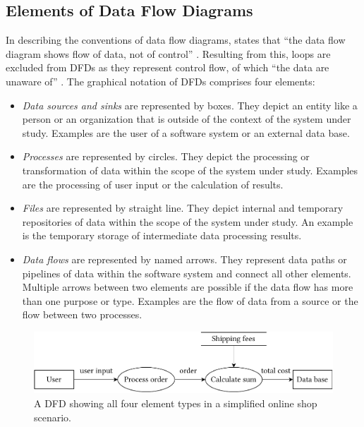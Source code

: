\subsection{Elements of Data Flow Diagrams}

In describing the conventions of data flow diagrams, \textcite{demarco_structure_1979} states that \enquote{the data flow diagram shows flow of data, not of control} \cite{demarco_structure_1979}.
Resulting from this, loops are excluded from \acp{DFD} as they represent control flow, of which \enquote{the data are unaware of} \cite{demarco_structure_1979}.
The graphical notation of \acp{DFD} comprises four elements:

\begin{itemize}
    \item \emph{Data sources and sinks} are represented by boxes.
    They depict an entity like a person or an organization that is outside of the context of the system under study.
    Examples are the user of a software system or an external data base.
    \item \emph{Processes} are represented by circles.
    They depict the processing or transformation of data within the scope of the system under study.
    Examples are the processing of user input or the calculation of results.
    \item \emph{Files} are represented by straight line.
    They depict internal and temporary repositories of data within the scope of the system under study.
    An example is the temporary storage of intermediate data processing results.
    \item \emph{Data flows} are represented by named arrows.
    They represent data paths or pipelines of data within the software system and connect all other elements.
    Multiple arrows between two elements are possible if the data flow has more than one purpose or type.
    Examples are the flow of data from a source or the flow between two processes.
\end{itemize}

\begin{figure}[b]
    \centering
    \includegraphics[width=\textwidth]{figures/chapter2/dataflowdiagram.pdf}
    \caption{A \acf*{DFD} showing all four element types in a simplified online shop scenario.}
    \label{fig:foundations:dataflowdiagram}
\end{figure}

